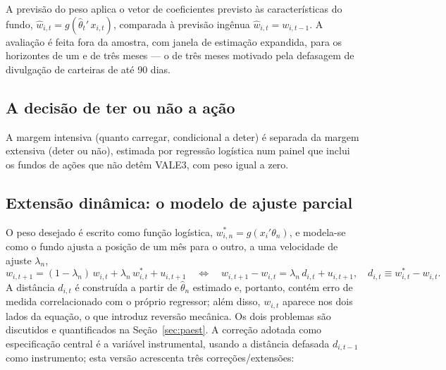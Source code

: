 \documentclass[12pt,a4paper]{article}
\begin{document}
A previsão do peso aplica o vetor de coeficientes previsto às características do fundo,
$\widehat{w}_{i,t} = g(\widehat{\theta}_t'\,x_{i,t})$, comparada à previsão ingênua
$\widehat{w}_{i,t}=w_{i,t-1}$. A avaliação é feita fora da amostra, com janela de estimação
expandida, para os horizontes de um e de três meses --- o de três meses motivado pela defasagem
de divulgação de carteiras de até 90 dias.

\subsection{A decisão de ter ou não a ação}

A margem intensiva (quanto carregar, condicional a deter) é separada da margem extensiva (deter
ou não), estimada por regressão logística num painel que inclui os fundos de ações que não
detêm VALE3, com peso igual a zero.

\subsection{Extensão dinâmica: o modelo de ajuste parcial}
\label{sec:pa}

O peso desejado é escrito como função logística, $w_{i,n}^{*} = g(x_i'\theta_n)$, e modela-se
como o fundo ajusta a posição de um mês para o outro, a uma velocidade de ajuste $\lambda_n$,
\begin{equation}
w_{i,t+1} = (1-\lambda_n)\,w_{i,t} + \lambda_n\,w^{*}_{i,t} + u_{i,t+1}
\quad\Longleftrightarrow\quad
w_{i,t+1}-w_{i,t} = \lambda_n\,d_{i,t} + u_{i,t+1}, \quad d_{i,t}\equiv w^{*}_{i,t}-w_{i,t}.
\label{eq:pa2}
\end{equation}
A distância $d_{i,t}$ é construída a partir de $\widehat{\theta}_n$ estimado e, portanto, contém
erro de medida correlacionado com o próprio regressor; além disso, $w_{i,t}$ aparece nos dois
lados da equação, o que introduz reversão mecânica. Os dois problemas são discutidos e
quantificados na Seção~\ref{sec:paest}. A correção adotada como especificação central é a
variável instrumental, usando a distância defasada $d_{i,t-1}$ como instrumento; esta versão
acrescenta três correções/extensões:
\end{document}
